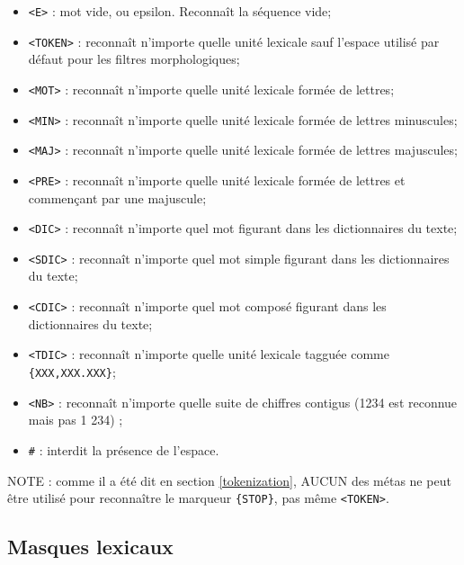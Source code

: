 \bigskip
{}
\index{\verb+#+}
\begin{itemize}
  \item \verb+<E>+ : mot vide, ou epsilon. Reconnaît la séquence vide;
  \item \verb+<TOKEN>+ : reconnaît n’importe quelle unité lexicale sauf l'espace
  	  utilisé par défaut pour les filtres morphologiques;
  \item \verb+<MOT>+ : reconnaît n’importe quelle unité lexicale formée de lettres;
  \item \verb+<MIN>+ : reconnaît n’importe quelle unité lexicale formée de lettres minuscules;
  \item \verb+<MAJ>+ : reconnaît n’importe quelle unité lexicale formée de lettres majuscules;
  \item \verb+<PRE>+ : reconnaît n’importe quelle unité lexicale formée de lettres et commençant par
  	  une
majuscule;
  \item \verb+<DIC>+ : reconnaît n’importe quel mot figurant dans les dictionnaires du texte;
  \item \verb+<SDIC>+ : reconnaît n’importe quel mot simple figurant dans les dictionnaires du
  	  texte;
  \item \verb+<CDIC>+ : reconnaît n’importe quel mot composé figurant dans les dictionnaires du
  	  texte;
  \item \verb+<TDIC>+ : reconnaît n’importe quelle unité lexicale tagguée comme
  	  \verb+{XXX,XXX.XXX}+;
  \item \verb+<NB>+ : reconnaît n’importe quelle suite de chiffres contigus
  	  (1234 est reconnue mais pas 1 234) ;
  \item \verb+#+ : interdit la présence de l'espace.
\end{itemize}

\bigskip
\noindent NOTE : comme il a été dit en section \ref{tokenization}, AUCUN des métas ne peut être utilisé pour reconnaître le marqueur \verb+{STOP}+, pas même \verb+<TOKEN>+.

\subsection{Masques lexicaux}

